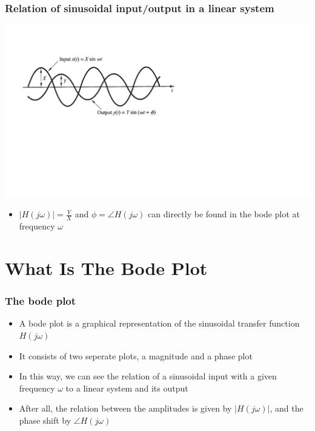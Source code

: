 \begin{frame}
\frametitle{Relation of sinusoidal input/output in a linear system}


\includegraphics[scale=0.5]{IOSinus}


\begin{itemize}
\item $|H(j\omega)| = \frac{Y}{X}$ and $\phi = \angle H(j\omega)$ can directly be found in the bode plot at frequency $\omega$
\end{itemize}

\end{frame}

\section{What Is The Bode Plot}

\begin{frame}
\frametitle{The bode plot}

\begin{itemize}
\item A bode plot is a graphical representation of the sinusoidal transfer function $H(j\omega)$
\item It consists of two seperate plots, a magnitude and a phase plot
\item In this way, we can see the relation of a sinusoidal input with a given frequency $\omega$ to a linear system and its output
\item After all, the relation between the amplitudes is given by $|H(j\omega)|$, and the phase shift by $\angle H(j\omega)$

\end{itemize}


\end{frame}


